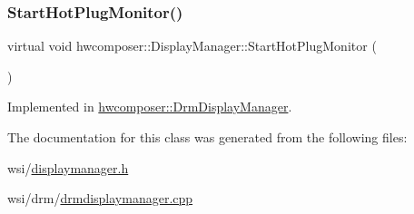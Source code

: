 \subsubsection{\texorpdfstring{Start\+Hot\+Plug\+Monitor()}{StartHotPlugMonitor()}}
{\footnotesize\ttfamily virtual void hwcomposer\+::\+Display\+Manager\+::\+Start\+Hot\+Plug\+Monitor (\begin{DoxyParamCaption}{ }\end{DoxyParamCaption})\hspace{0.3cm}{\ttfamily [pure virtual]}}



Implemented in \mbox{\hyperlink{classhwcomposer_1_1DrmDisplayManager_a103a45f1e7e31c813dc7e185e244d944}{hwcomposer\+::\+Drm\+Display\+Manager}}.



The documentation for this class was generated from the following files\+:\begin{DoxyCompactItemize}
\item 
wsi/\mbox{\hyperlink{displaymanager_8h}{displaymanager.\+h}}\item 
wsi/drm/\mbox{\hyperlink{drmdisplaymanager_8cpp}{drmdisplaymanager.\+cpp}}\end{DoxyCompactItemize}
